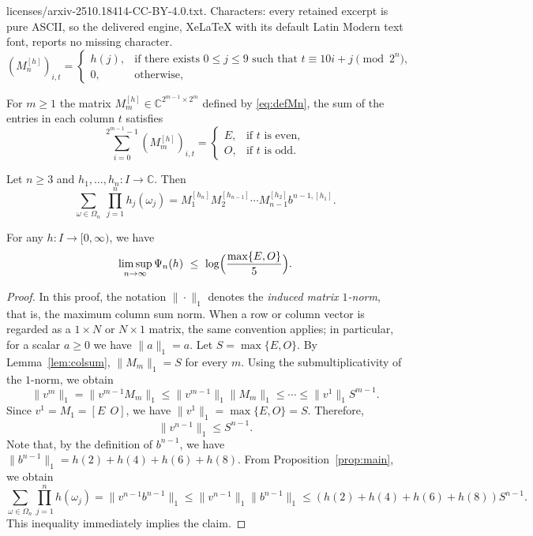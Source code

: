 \documentclass[10pt,a4paper]{amsart}
\begin{document}
licenses/arxiv-2510.18414-CC-BY-4.0.txt. Characters: every retained excerpt is pure ASCII, so the delivered engine, XeLaTeX with its default Latin Modern text font, reports no missing character.
\begin{equation}\label{eq:defMn}
(M_n^{[h]})_{i,t} =
\begin{cases}
h(j), & \text{if there exists } 0\le j\le 9 \text{ such that } t \equiv 10 i + j \pmod{2^n},\\[6pt]
0, & \text{otherwise},
\end{cases}
\end{equation}

\begin{lemma}\label{lem:colsum}
For $m\ge 1$ the matrix $M_m^{[h]}\in\mathbb{C}^{2^{m-1}\times 2^{m}}$ defined by \eqref{eq:defMn}, the sum of the entries in each column $t$ satisfies
\[
\sum_{i=0}^{2^{m-1}-1} (M_m^{[h]})_{i,t} =
\begin{cases}
E, & \text{if } t \text{ is even},\\[1ex]
O, & \text{if } t \text{ is odd}.
\end{cases}
\]
\end{lemma}

\begin{proposition}\label{prop:main}
Let $n\ge 3$ and $h_1,\dots,h_n:I\to\mathbb{C}$. Then
\[
\sum_{\omega\in\Omega_n}\ \prod_{j=1}^n h_j(\omega_j)
=
M_1^{[h_n]}   M_2^{[h_{n-1}]} \cdots M_{n-1}^{[h_2]}   b^{n-1,[h_1]}.
\]
\end{proposition}

\begin{proposition}\label{prop:1norm}
For any $h:I\to[0,\infty)$, we have
\[
\limsup_{n\to\infty}\Psi_n(h)
\ \le\
\log \Bigl(\frac{\max\{E,O\}}{5}\Bigr).
\]
\end{proposition}

\begin{proof}
In this proof, the notation $\|\cdot\|_1$ denotes the \emph{induced matrix $1$-norm},
that is, the maximum column sum norm.
When a row or column vector is regarded as a $1\times N$ or $N\times1$ matrix,
the same convention applies; in particular, for a scalar $a\ge0$ we have $\|a\|_1 = a$.
Let $S = \max\{E,O\}$.  
By Lemma~\ref{lem:colsum}, $\|M_m\|_1 = S$ for every $m$.  
Using the submultiplicativity of the $1$-norm, we obtain
\[
\|v^m\|_1 = \|v^{m-1}M_m\|_1
 \le \|v^{m-1}\|_1 \|M_m\|_1
 \le \cdots \le \|v^1\|_1 S^{m-1}.
\]
Since $v^1 = M_1 = [E\ \ O]$, we have $\|v^1\|_1 = \max\{E,O\} = S$.  
Therefore,
\[
\|v^{n-1}\|_1 \le S^{n-1}.
\]
Note that, by the definition of $b^{n-1}$, we have $\|b^{n-1}\|_1 = h(2)+h(4)+h(6)+h(8)$.  
From Proposition~\ref{prop:main}, we obtain
\[
\sum_{\omega\in\Omega_n}\prod_{j=1}^n h(\omega_j)
=\| v^{n-1}b^{n-1} \|_1
\le 
\|v^{n-1}\|_1 \|b^{n-1}\|_1
 \le
(h(2)+h(4)+h(6)+h(8)) S^{n-1}.
\]
This inequality immediately implies the claim.
\end{proof}
\end{document}
